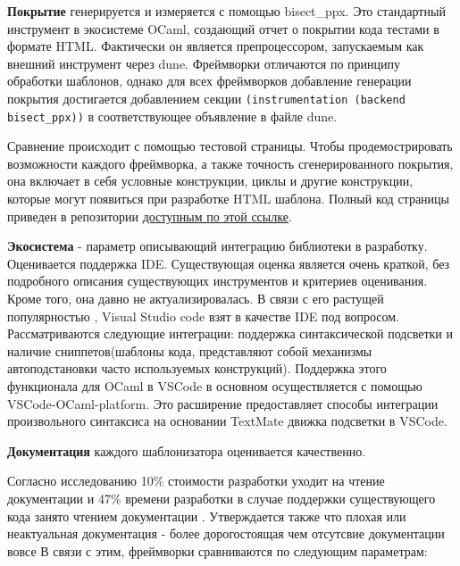 \textbf{Покрытие} генерируется и измеряется с помощью bisect\_ppx.
Это стандартный инструмент в экосистеме OCaml, создающий отчет о покрытии кода тестами в формате HTML.
Фактически он является препроцессором, запускаемым как внешний инструмент через dune.
Фреймворки отличаются по принципу обработки шаблонов, однако для всех фреймворков добавление генерации покрытия достигается добавлением секции \texttt{(instrumentation (backend bisect\_ppx))} в соответствующее объявление в файле dune.

Сравнение происходит с помощью тестовой страницы.
Чтобы продемострировать возможности каждого фреймворка, а также точность сгенерированного покрытия, она включает в себя условные конструкции, циклы и другие конструкции, которые могут появиться при разработке HTML шаблона.
Полный код страницы приведен в репозитории \href{https://github.com/katel0k/dream_templaters_comparison}{доступным по этой ссылке}.

\textbf{Экосистема} - параметр описывающий интеграцию библиотеки в разработку.
Оценивается поддержка IDE.
Существующая оценка является очень краткой, без подробного описания существующих инструментов и критериев оценивания.
Кроме того, она давно не актуализировалась.
В связи с его растущей популярностью \cite{VSCode2025}, Visual Studio code взят в качестве IDE под вопросом.
Рассматриваются следующие интеграции: поддержка синтаксической подсветки и наличие сниппетов(шаблоны кода, представляют собой механизмы автоподстановки часто используемых конструкций).
Поддержка этого функционала для OCaml в VSCode в основном осуществляется с помощью VSCode-OCaml-platform.
Это расширение предоставляет способы интеграции произвольного синтаксиса на основании TextMate движка подсветки в VSCode.





\textbf{Документация} каждого шаблонизатора оценивается качественно.

Согласно исследованию\cite{boehm1975high} %
10\% стоимости разработки уходит на чтение документации %
и 47\% времени разработки в случае поддержки существующего кода занято чтением документации \cite{fjeldstad1983application}.
Утверждается также что плохая или неактуальная документация - более дорогостоящая чем отсутсвие документации вовсе\cite{poston1984does}
В связи с этим, фреймворки сравниваются по следующим параметрам:


